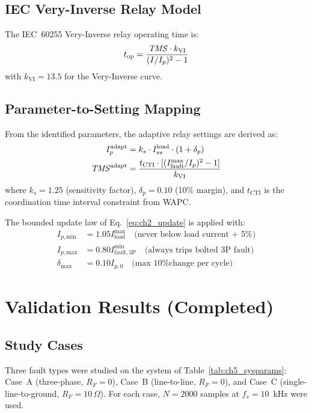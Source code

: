 \subsection{IEC Very-Inverse Relay Model}

The IEC~60255 Very-Inverse relay operating time is:
\begin{equation}
  t_\mathrm{op} = \frac{\mathit{TMS} \cdot k_\mathrm{VI}}{(I/I_p)^2 - 1}
  \label{eq:ch5_iec_vi}
\end{equation}
with $k_\mathrm{VI} = 13.5$ for the Very-Inverse curve.

\subsection{Parameter-to-Setting Mapping}

From the identified parameters, the adaptive relay settings are derived as:
\begin{align}
  I_p^\mathrm{adapt} &= k_s \cdot I_{ss}^\mathrm{load} \cdot (1 + \delta_p)
  \label{eq:ch5_ip_adapt} \\
  \mathit{TMS}^\mathrm{adapt} &= \frac{t_\mathrm{CTI} \cdot [(I_\mathrm{fault}^\mathrm{max}/I_p)^2 - 1]}{k_\mathrm{VI}}
  \label{eq:ch5_tms_adapt}
\end{align}
where $k_s = 1.25$ (sensitivity factor), $\delta_p = 0.10$ (10\% margin),
and $t_\mathrm{CTI}$ is the coordination time interval constraint from WAPC.

The bounded update law of Eq.~\eqref{eq:ch2_update} is applied with:
\begin{align}
  I_{p,\mathrm{min}} &= 1.05 I_\mathrm{load}^\mathrm{max}
  \quad\text{(never below load current + 5\%)} \\
  I_{p,\mathrm{max}} &= 0.80 I_\mathrm{fault,3P}^\mathrm{min}
  \quad\text{(always trips bolted 3P fault)} \\
  \delta_\mathrm{max} &= 0.10 I_{p,0}
  \quad\text{(max 10\% change per cycle)}
\end{align}

\section{Validation Results (Completed)}
\label{sec:ch5_results}

\subsection{Study Cases}

Three fault types were studied on the system of Table~\ref{tab:ch5_sysparams}:
Case~A (three-phase, $R_F = 0$), Case~B (line-to-line, $R_F = 0$),
and Case~C (single-line-to-ground, $R_F = 10\,\Omega$).
For each case, $N = 2000$ samples at $f_s = 10$~kHz were used.

